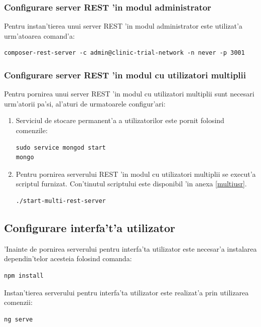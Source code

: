 \documentclass[12pt,a4paper,twoside]{report}
\begin{document}
\subsubsection{Configurare server REST 'in modul administrator}
Pentru instan'tierea unui server REST 'in modul administrator este utilizat'a urm'atoarea comand'a:
  \begin{lstlisting}[backgroundcolor=\color{light-gray}]
composer-rest-server -c admin@clinic-trial-network -n never -p 3001
        \end{lstlisting}

\subsubsection{Configurare server REST 'in modul cu utilizatori multiplii}\label{multi:rest}

Pentru pornirea unui server REST 'in modul cu utilizatori multiplii sunt necesari urm'atorii pa'si, al'aturi de urmatoarele configur'ari:
\begin{enumerate}
    \item Serviciul de stocare permanent'a a utilizatorilor este pornit folosind comenzile:
      \begin{lstlisting}[backgroundcolor=\color{light-gray}]
sudo service mongod start
mongo
       \end{lstlisting}
    \item Pentru pornirea serverului REST 'in modul cu utilizatori multiplii se execut'a scriptul furnizat. Con'tinutul scriptului este disponibil 'in anexa \ref{multiusr}.
     \begin{lstlisting}[backgroundcolor=\color{light-gray}]
./start-multi-rest-server
       \end{lstlisting}
       
\end{enumerate}

\subsection{Configurare interfa't'a utilizator}
'Inainte de pornirea serverului pentru interfa'ta utilizator este necesar'a instalarea dependin'telor acesteia folosind comanda:
\begin{lstlisting}[backgroundcolor=\color{light-gray}]
npm install
       \end{lstlisting}
       
Instan'tierea serverului pentru interfa'ta utilizator este realizat'a prin utilizarea\\ comenzii:       
\begin{lstlisting}[backgroundcolor=\color{light-gray}]
ng serve
\end{lstlisting}
\end{document}
